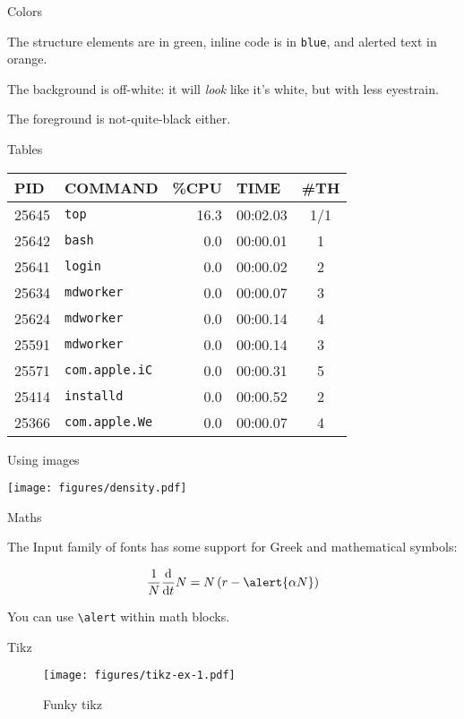 \documentclass[11pt, compress, aspectratio=1610]{beamer}
\let\OldTexttt\texttt
\renewcommand{\texttt}[1]{\OldTexttt{\color{plTT}#1}}
\begin{document}
\begin{frame}[fragile]{Colors}

The structure elements are in green, inline code is in \texttt{blue},
and alerted text in \alert{orange}.

The background is off-white: it will \emph{look} like it's white, but
with less eyestrain.

The foreground is not-quite-black either.

\end{frame}

\begin{frame}[fragile]{Tables}

\begin{longtable}[]{@{}llrlc@{}}
\toprule
PID & COMMAND & \%CPU & TIME & \#TH\tabularnewline
\midrule
\endhead
25645 & \texttt{top} & 16.3 & 00:02.03 & 1/1\tabularnewline
25642 & \texttt{bash} & 0.0 & 00:00.01 & 1\tabularnewline
25641 & \texttt{login} & 0.0 & 00:00.02 & 2\tabularnewline
25634 & \texttt{mdworker} & 0.0 & 00:00.07 & 3\tabularnewline
25624 & \texttt{mdworker} & 0.0 & 00:00.14 & 4\tabularnewline
25591 & \texttt{mdworker} & 0.0 & 00:00.14 & 3\tabularnewline
25571 & \texttt{com.apple.iC} & 0.0 & 00:00.31 & 5\tabularnewline
25414 & \texttt{installd} & 0.0 & 00:00.52 & 2\tabularnewline
25366 & \texttt{com.apple.We} & 0.0 & 00:00.07 & 4\tabularnewline
\bottomrule
\end{longtable}

\end{frame}

\begin{frame}{Using images}

\texttt{[image: figures/density.pdf]}

\end{frame}

\begin{frame}[fragile]{Maths}

The Input family of fonts has some support for Greek and mathematical
symbols:

\[
\frac{1}{N}\frac{\text{d}}{\text{d}t}N = N\left(r-\alert{\alpha N}\right)
\]

You can use \texttt{\textbackslash{}alert} within math blocks.

\end{frame}

\begin{frame}{Tikz}

\begin{figure}
\centering
\texttt{[image: figures/tikz-ex-1.pdf]}
\caption{Funky tikz}
\end{figure}

\end{frame}
\end{document}
